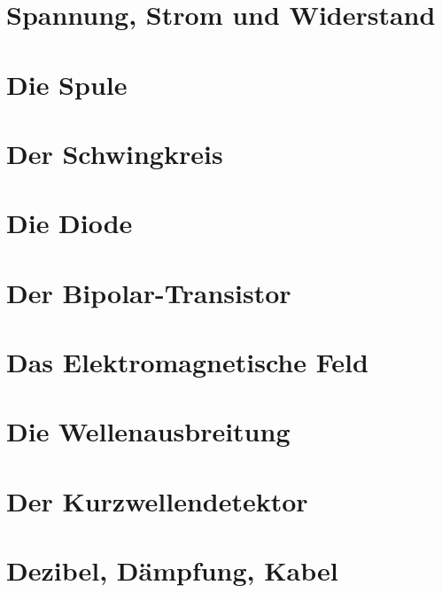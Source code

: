 \documentclass[ngerman,openany, twoside]{Script}
\begin{document}


\newpage

\chapter{Spannung, Strom und Widerstand}


\chapter{Die Spule}


\chapter{Der Schwingkreis}


\chapter{Die Diode}


\chapter{Der Bipolar-Transistor}


\newpage \vspace*{5cm}
\newpage

\chapter{Das Elektromagnetische Feld}


\newpage \vspace*{5cm}
\newpage

\chapter{Die Wellenausbreitung}


\chapter{Der Kurzwellendetektor}


\chapter{Dezibel, Dämpfung, Kabel}

\end{document}
